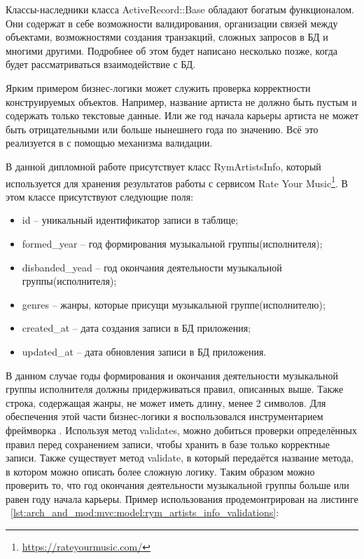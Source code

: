 Классы-наследники класса ActiveRecord::Base обладают богатым функционалом. Они содержат в себе возможности валидирования, организации связей между объектами, возможностями создания транзакций, сложных запросов в БД и многими другими. Подробнее об этом будет написано несколько позже, когда будет рассматриваться взаимодействие с БД.

Ярким примером бизнес-логики может служить проверка корректности конструируемых объектов. Например, название артиста не должно быть пустым и содержать только текстовые данные. Или же год начала карьеры артиста не может быть отрицательными или больше нынешнего года по значению. Всё это реализуется в \ror{} с помощью механизма валидации.

В данной дипломной работе присутствует класс RymArtistsInfo, который используется для хранения результатов работы с сервисом Rate Your Music\footnote{\url{https://rateyourmusic.com/}}. В этом классе присутствуют следующие поля:

\begin{itemize}
  \item id -- уникальный идентификатор записи в таблице;
  \item formed\_year -- год формирования музыкальной группы(исполнителя);
  \item disbanded\_yead -- год окончания деятельности музыкальной группы(исполнителя);
  \item genres -- жанры, которые присущи музыкальной группе(исполнителю);
  \item created\_at -- дата создания записи в БД приложения;
  \item updated\_at -- дата обновления записи в БД приложения.
\end{itemize}

В данном случае годы формирования и окончания деятельности музыкальной группы исполнителя должны придерживаться правил, описанных выше. Также строка, содержащая жанры, не может иметь длину, менее 2 символов. Для обеспечения этой части бизнес-логики я воспользовался инструментарием фреймворка \ror{}. Используя метод validates, можно добиться проверки определённых правил перед сохранением записи, чтобы хранить в базе только корректные записи. Также существует метод validate, в который передаётся название метода, в котором можно описать более сложную логику. Таким образом можно проверить то, что год окончания деятельности музыкальной группы больше или равен году начала карьеры. Пример использования продемонтрирован на листинге ~\ref{lst:arch_and_mod:mvc:model:rym_artists_info_validations}:

